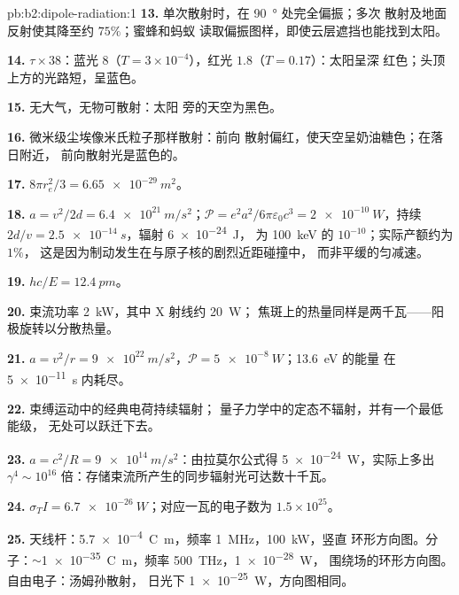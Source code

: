 \begin{solution}{pb:b2:dipole-radiation:1}
\textbf{13.} 单次散射时，在 \qty{90}{\degree} 处完全偏振；多次
散射及地面反射使其降至约 $75\%$；蜜蜂和蚂蚁
读取偏振图样，即使云层遮挡也能找到太阳。

\textbf{14.} $\tau \times 38$：蓝光 $8$（$T = 3 \times 10^{-4}$），红光 $1.8$（$T = 0.17$）：太阳呈深
红色；头顶上方的光路短，呈蓝色。

\textbf{15.} 无大气，无物可散射：太阳
旁的天空为黑色。

\textbf{16.} 微米级尘埃像米氏粒子那样散射：前向
散射偏红，使天空呈奶油糖色；在落日附近，
前向散射光是蓝色的。

\textbf{17.} $8\pi r_e^2/3 = \qty{6.65e-29}{m^2}$。

\textbf{18.} $a = v^2/2d = \qty{6.4e21}{m/s^2}$；$\mathcal P = e^2a^2/6\pi\varepsilon_0c^3 =
\qty{2e-10}{W}$，持续 $2d/v = \qty{2.5e-14}{s}$，辐射 \qty{6e-24}{J}，
为 \qty{100}{keV} 的 $10^{-10}$；实际产额约为 $1\%$，
这是因为制动发生在与原子核的剧烈近距碰撞中，
而非平缓的匀减速。

\textbf{19.} $hc/E = \qty{12.4}{pm}$。

\textbf{20.} 束流功率 \qty{2}{kW}，其中 X 射线约 \qty{20}{W}；
焦斑上的热量同样是两千瓦——阳极旋转以分散热量。

\textbf{21.} $a = v^2/r = \qty{9e22}{m/s^2}$，$\mathcal P = \qty{5e-8}{W}$；\qty{13.6}{eV} 的能量
在 \qty{5e-11}{s} 内耗尽。

\textbf{22.} 束缚运动中的经典电荷持续辐射；
量子力学中的定态不辐射，并有一个最低能级，
无处可以跃迁下去。

\textbf{23.} $a = c^2/R = \qty{9e14}{m/s^2}$：由拉莫尔公式得 \qty{5e-24}{W}，实际上多出 $\gamma^4 \sim 10^{16}$
倍：存储束流所产生的同步辐射光可达数十千瓦。
%

\textbf{24.} $\sigma_TI = \qty{6.7e-26}{W}$；对应一瓦的电子数为 $1.5 \times 10^{25}$。

\textbf{25.} 天线杆：\qty{5.7e-4}{C.m}，频率 \qty{1}{MHz}，\qty{100}{kW}，竖直
环形方向图。分子：$\sim$\qty{1e-35}{C.m}，频率 \qty{500}{THz}，\qty{1e-28}{W}，
围绕场的环形方向图。自由电子：汤姆孙散射，
日光下 \qty{1e-25}{W}，方向图相同。
\end{solution}
